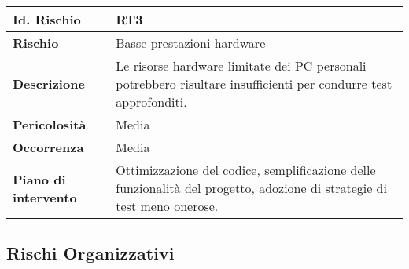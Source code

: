 \begin{tabular}{|L{4cm}|L{9.7cm}|}
    \hline
    \textbf{Id. Rischio} & \textbf{RT3} \\
    \hline
    \textbf{Rischio} & Basse prestazioni hardware \\
    \hline
    \textbf{Descrizione} & Le risorse hardware limitate dei PC personali potrebbero risultare insufficienti per condurre test approfonditi. \\
    \hline
    \textbf{Pericolosità} & Media \\
    \hline
    \textbf{Occorrenza} & Media \\
    \hline
    \textbf{Piano di intervento} & Ottimizzazione del codice, semplificazione delle funzionalità del progetto, adozione di strategie di test meno onerose. \\
    \hline
\end{tabular}

\subsection{Rischi Organizzativi}

